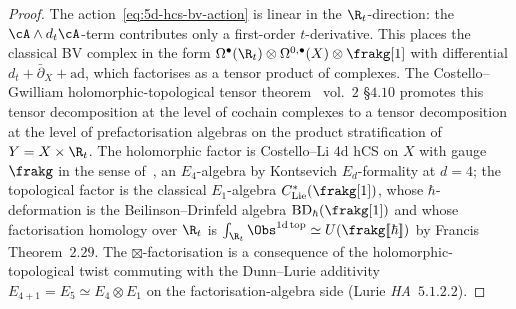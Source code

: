 \begin{proof}
The action~\eqref{eq:5d-hcs-bv-action} is linear in the $\R_t$-direction: the $\cA \wedge d_t \cA$-term contributes only a first-order $t$-derivative. This places the classical BV complex in the form $\Omega^\bullet(\R_t) \otimes \Omega^{0, \bullet}(X) \otimes \frakg[1]$ with differential $d_t + \bar{\partial}_X + \mathrm{ad}$, which factorises as a tensor product of complexes. The Costello--Gwilliam holomorphic-topological tensor theorem~\cite{CostelloGwilliam} vol.~$2$ §$4.10$ promotes this tensor decomposition at the level of cochain complexes to a tensor decomposition at the level of prefactorisation algebras on the product stratification of $Y = X \times \R_t$. The holomorphic factor is Costello--Li $4$d hCS on $X$ with gauge $\frakg$ in the sense of~\cite{CostelloLi2020}, an $E_4$-algebra by Kontsevich $E_d$-formality at $d = 4$; the topological factor is the classical $E_1$-algebra $C^*_{\mathrm{Lie}}(\frakg[1])$, whose $\hbar$-deformation is the Beilinson--Drinfeld algebra $\mathrm{BD}_\hbar(\frakg[1])$ and whose factorisation homology over $\R_t$ is $\int_{\R_t} \Obs^{1\mathrm{d\,top}} \simeq U(\frakg[\![\hbar]\!])$ by Francis~\cite{Francis2013} Theorem~$2.29$. The $\boxtimes$-factorisation is a consequence of the holomorphic-topological twist commuting with the Dunn--Lurie additivity $E_{4 + 1} = E_5 \simeq E_4 \otimes E_1$ on the factorisation-algebra side \textup{(}Lurie \emph{HA}~$5.1.2.2$\textup{).}
\end{proof}

